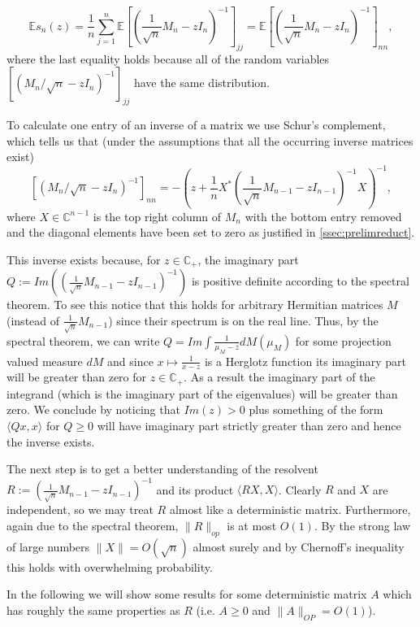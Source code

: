 \begin{equation}\label{eq:schursComplementForEs}
	\mathbb Es_n(z) = \frac{1}{n}\sum_{j=1}^n\mathbb E\left[\left(\frac{1}{\sqrt n}M_n-zI_n\right)^{-1}\right]_{jj}=\mathbb E\left[\left(\frac{1}{\sqrt n}M_n-zI_n\right)^{-1}\right]_{nn},
\end{equation}
where the last equality holds because all of the random variables \newline$\left[(M_n/\sqrt n-zI_n)^{-1}\right]_{jj}$ have the same distribution.

To calculate one entry of an inverse of a matrix we use Schur's complement, which tells us that (under the assumptions that all the occurring inverse matrices exist) $$[(M_n/\sqrt n-zI_n)^{-1}]_{nn}=-\left(z+\frac{1}{n}X^*(\frac{1}{\sqrt n}M_{n-1}-zI_{n-1})^{-1}X\right)^{-1},$$ where $X\in\mathbb C^{n-1}$ is the top right column of $M_n$ with the bottom entry removed and the diagonal elements have been set to zero as justified in \ref{ssec:prelimreduct}.

This inverse exists because, for $z\in\mathbb C_+$, the imaginary part $Q:=Im\left((\frac{1}{\sqrt n}M_{n-1}-zI_{n-1})^{-1}\right)$ is positive definite according to the spectral theorem. To see this notice that this holds for arbitrary Hermitian matrices $M$ (instead of $\frac{1}{\sqrt n}M_{n-1}$) since their spectrum is on the real line. Thus, by the spectral theorem, we can write $Q=Im\int\frac{1}{\mu_M-z}dM(\mu_M)$ for some projection valued measure $dM$ and since $x\mapsto\frac{1}{x-z}$ is a Herglotz function its imaginary part will be greater than zero for $z\in\mathbb C_+$. As a result the imaginary part of the integrand (which is the imaginary part of the eigenvalues) will be greater than zero.
We conclude by noticing that $Im(z)>0$ plus something of the form $\langle Qx,x\rangle$ for $Q\geq 0$ will have imaginary part strictly greater than zero and hence the inverse exists.

The next step is to get a better understanding of the resolvent $R:=(\frac{1}{\sqrt n}M_{n-1}-zI_{n-1})^{-1}$ and its product $\langle RX,X\rangle$. Clearly $R$ and $X$ are independent, so we may treat $R$ almost like a deterministic matrix. Furthermore, again due to the spectral theorem, $\|R\|_{op}$ is at most $O(1)$. By the strong law of large numbers $\|X\|=O(\sqrt n)$ almost surely and by Chernoff's inequality this holds with overwhelming probability.

In the following we will show some results for some deterministic matrix $A$ which has roughly the same properties as $R$ (i.e. $A\geq 0$ and $\|A\|_{OP}=O(1)$).

